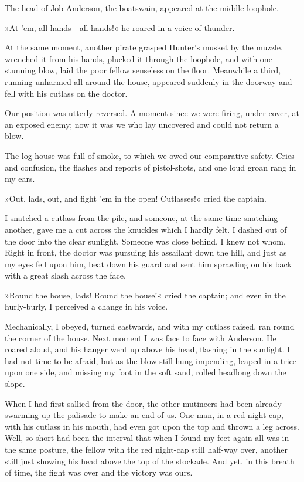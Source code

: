 The head of Job Anderson, the boatswain, appeared at the middle loophole.

»At 'em, all hands—all hands!« he roared in a voice of thunder.

At the same moment, another pirate grasped Hunter's musket by the muzzle, wrenched it from his hands, plucked it through the loophole, and with one stunning blow, laid the poor fellow senseless on the floor. Meanwhile a third, running unharmed all around the house, appeared suddenly in the doorway and fell with his cutlass on the doctor.

Our position was utterly reversed. A moment since we were firing, under cover, at an exposed enemy; now it was we who lay uncovered and could not return a blow.

The log-house was full of smoke, to which we owed our comparative safety. Cries and confusion, the flashes and reports of pistol-shots, and one loud groan rang in my ears.

»Out, lads, out, and fight 'em in the open! Cutlasses!« cried the captain.

I snatched a cutlass from the pile, and someone, at the same time snatching another, gave me a cut across the knuckles which I hardly felt. I dashed out of the door into the clear sunlight. Someone was close behind, I knew not whom. Right in front, the doctor was pursuing his assailant down the hill, and just as my eyes fell upon him, beat down his guard and sent him sprawling on his back with a great slash across the face.

»Round the house, lads! Round the house!« cried the captain; and even in the hurly-burly, I perceived a change in his voice.

Mechanically, I obeyed, turned eastwards, and with my cutlass raised, ran round the corner of the house. Next moment I was face to face with Anderson. He roared aloud, and his hanger went up above his head, flashing in the sunlight. I had not time to be afraid, but as the blow still hung impending, leaped in a trice upon one side, and missing my foot in the soft sand, rolled headlong down the slope.

When I had first sallied from the door, the other mutineers had been already swarming up the palisade to make an end of us. One man, in a red night-cap, with his cutlass in his mouth, had even got upon the top and thrown a leg across. Well, so short had been the interval that when I found my feet again all was in the same posture, the fellow with the red night-cap still half-way over, another still just showing his head above the top of the stockade. And yet, in this breath of time, the fight was over and the victory was ours.

